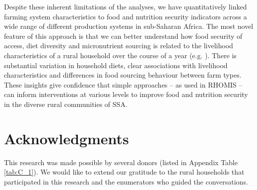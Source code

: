 Despite these inherent limitations of the analyses, we have quantitatively linked farming system characteristics to food and nutrition security indicators across a wide range of different production systems in sub-Saharan Africa. The most novel feature of this approach is that we can better understand how food security of access, diet diversity and micronutrient sourcing is related to the livelihood characteristics of a rural household over the course of a year (e.g. \citealp{Hammond2017225}). There is substantial variation in household diets, clear associations with livelihood characteristics and differences in food sourcing behaviour between farm types. These insights give confidence that simple approaches -- as used in RHOMIS -- can inform interventions at various levels to improve food and nutrition security in the diverse rural communities of SSA.

\section{Acknowledgments}

This research was made possible by several donors (listed in Appendix Table \ref{tab:C_1}). We would like to extend our gratitude to the rural households that participated in this research and the enumerators who guided the conversations.
